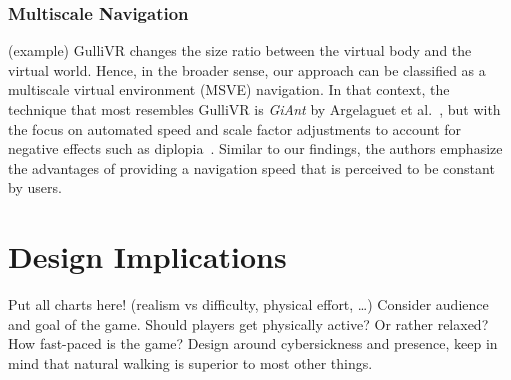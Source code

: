 \subsubsection{Multiscale Navigation}

(example)
GulliVR changes the size ratio between the virtual body and the virtual world. Hence, in the broader sense, our approach can be classified as a multiscale virtual environment (MSVE) navigation. In that context, the technique that most resembles GulliVR is \textit{GiAnt} by Argelaguet et al.~\cite{argelaguet2016giant}, but with the focus on automated speed and scale factor adjustments to account for negative effects such as diplopia~\cite{lambooij2009visual}. Similar to our findings, the authors emphasize the advantages of providing a navigation speed that is perceived to be constant by users.



\section{Design Implications}

Put all charts here! (realism vs difficulty, physical effort, …) Consider audience and goal of the game. Should players get physically active? Or rather relaxed? How fast-paced is the game? Design around cybersickness and presence, keep in mind that natural walking is superior to most other things.

